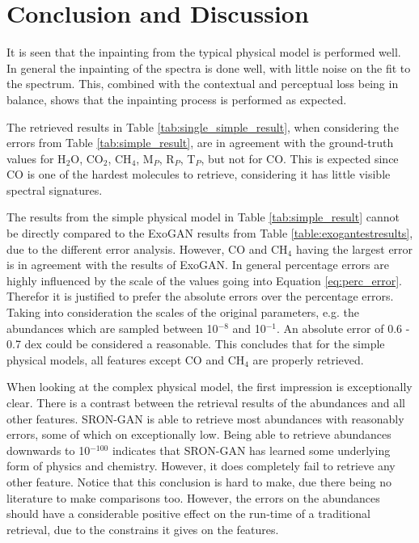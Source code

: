 \chapter{Conclusion and Discussion}
It is seen that the inpainting from the typical physical model is performed well. In general the inpainting of the spectra is done well, with little noise on the fit to the spectrum. This, combined with the contextual and perceptual loss being in balance, shows that the inpainting process is performed as expected.

The retrieved results in Table \ref{tab:single_simple_result}, when considering the errors from Table \ref{tab:simple_result}, are in agreement with the ground-truth values for H$_2$O, CO$_2$, CH$_4$, M$_P$, R$_P$, T$_P$, but not for CO. This is expected since CO is one of the hardest molecules to retrieve, considering it has little visible spectral signatures.


The results from the simple physical model in Table \ref{tab:simple_result} cannot be directly compared to the ExoGAN results from Table \ref{table:exogantestresults}, due to the different error analysis. However, CO and CH$_4$ having the largest error is in agreement with the results of ExoGAN. In general percentage errors are highly influenced by the scale of the values going into Equation \ref{eq:perc_error}. Therefor it is justified to prefer the absolute errors over the percentage errors. Taking into consideration the scales of the original parameters, e.g. the abundances which are sampled between 10$^{-8}$ and 10$^{-1}$. An absolute error of 0.6 - 0.7 dex could be considered a reasonable. This concludes that for the simple physical models, all features except CO and CH$_4$ are properly retrieved. 

When looking at the complex physical model, the first impression is exceptionally clear. There is a contrast between the retrieval results of the abundances and all other features. SRON-GAN is able to retrieve most abundances with reasonably errors, some of which on exceptionally low. Being able to retrieve abundances downwards to 10$^{-100}$ indicates that SRON-GAN has learned some underlying form of physics and chemistry. However, it does completely fail to retrieve any other feature. Notice that this conclusion is hard to make, due there being no literature to make comparisons too. However, the errors on the abundances should have a considerable positive effect on the run-time of a traditional retrieval, due to the constrains it gives on the features.

